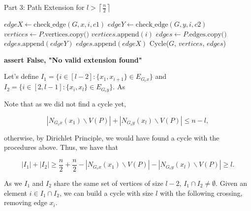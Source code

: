 \begin{algorithm}[H]
    \caption{Part 3: Path Extension for \( l > \left \lceil \frac{n}{2} \right \rceil \)}
    \begin{algorithmic}
            \For{$[c1, c2] \in [[cx, cy], [cy, cx]]$} 
                     
                        \State $edgeX \gets \text{check\_edge}(G, x, i, c1)$
                        \State $edgeY \gets \text{check\_edge}(G, y, i, c2)$
                            \State $vertices \gets P.\text{vertices.copy()}$
                            \State $vertices.\text{append}(i)$
                            \State $edges \gets P.\text{edges.copy()}$
                            \State $edges.\text{append}(edgeY)$
                            \State $edges.\text{append}(edgeX)$
                            \State \Return Cycle($G$, $vertices$, $edges$) 
                        \EndIf
                    \EndIf
                \EndFor
            \EndFor

            \State \textbf{assert False, "No valid extension found"}
        \EndFunction
    \end{algorithmic}
\end{algorithm}

Let's define $I_1 = \{i \in [l - 2]: \{x_1, x_{i + 1}\} \in E_{G_cx}\}$ and 
$I_2 = \{i \in [2, l - 1]: \{x_i, x_{l}\} \in E_{G_cy}\}$. As 

Note that as we did not find a cycle yet, 

$$
|N_{G_cx}(x_1) \backslash V(P)| + |N_{G_cy}(x_l) \backslash V(P)| \leq n - l,
$$

otherwise, by Dirichlet Principle, we would have found a cycle
with the procedures above. Thus, we have that

$$
|I_1| + |I_2| \geq \frac{n}{2} + \frac{n}{2} - |N_{G_cx}(x_1) \backslash V(P)| - |N_{G_cy}(x_l) \backslash V(P)| \geq l.
$$

As we $I_1$ and $I_2$ share the same set of vertices of size
$l - 2$, $I_1 \cap I_2 \neq \emptyset$. Given an element
$i \in I_1 \cap I_2$, we can build a cycle with size $l$ with
the following crossing, removing edge $x_i$.

